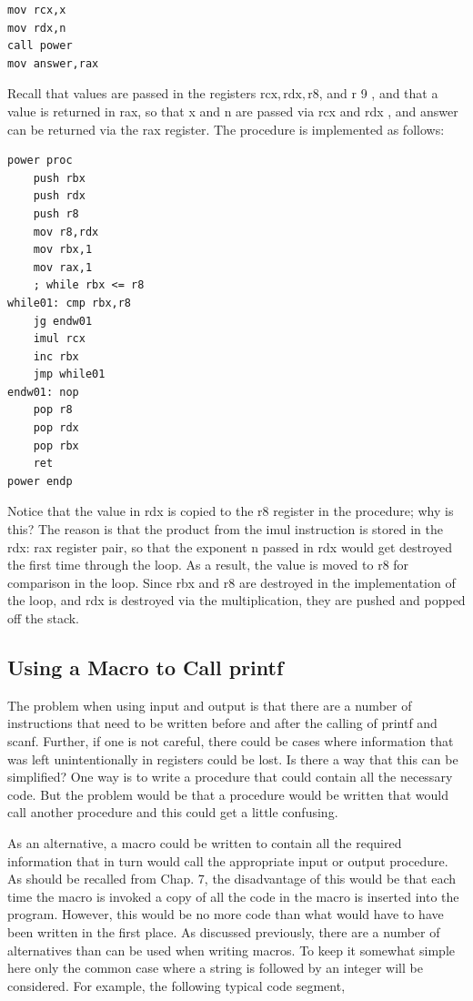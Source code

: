 \documentclass[10pt]{book}
\begin{document}
\begin{verbatim}
mov rcx,x
mov rdx,n
call power
mov answer,rax
\end{verbatim}

Recall that values are passed in the registers $\mathrm{rcx}, \mathrm{rdx}, \mathrm{r} 8$, and r 9 , and that a value is returned in rax, so that x and n are passed via rcx and rdx , and answer can be returned via the rax register. The procedure is implemented as follows:

\begin{verbatim}
power proc
    push rbx
    push rdx
    push r8
    mov r8,rdx
    mov rbx,1
    mov rax,1
    ; while rbx <= r8
while01: cmp rbx,r8
    jg endw01
    imul rcx
    inc rbx
    jmp while01
endw01: nop
    pop r8
    pop rdx
    pop rbx
    ret
power endp
\end{verbatim}

Notice that the value in rdx is copied to the r8 register in the procedure; why is this? The reason is that the product from the imul instruction is stored in the rdx: rax register pair, so that the exponent n passed in rdx would get destroyed the first time through the loop. As a result, the value is moved to r8 for comparison in the loop. Since rbx and r8 are destroyed in the implementation of the loop, and rdx is destroyed via the multiplication, they are pushed and popped off the stack.

\subsection{Using a Macro to Call printf}
The problem when using input and output is that there are a number of instructions that need to be written before and after the calling of printf and scanf. Further, if one is not careful, there could be cases where information that was left unintentionally in registers could be lost. Is there a way that this can be simplified? One way is to write a procedure that could contain all the necessary code. But the problem would be that a procedure would be written that would call another procedure and this could get a little confusing.

As an alternative, a macro could be written to contain all the required information that in turn would call the appropriate input or output procedure. As should be recalled from Chap. 7, the disadvantage of this would be that each time the macro is invoked a copy of all the code in the macro is inserted into the program. However, this would be no more code than what would have to have been written in the first place. As discussed previously, there are a number of alternatives than can be used when writing macros. To keep it somewhat simple here only the common case where a string is followed by an integer will be considered. For example, the following typical code segment,
\end{document}
